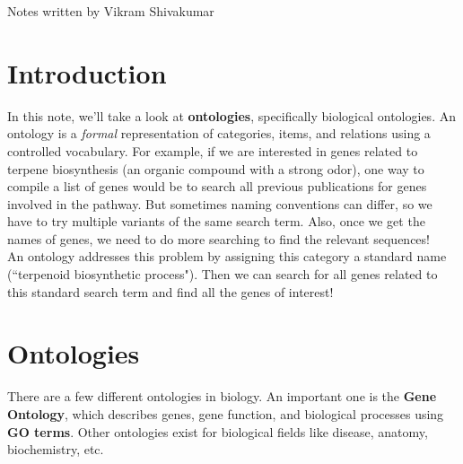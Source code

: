 \documentclass[12pt]{article}
\begin{document}
\thispagestyle{plain}
   \newpage
   \setcounter{page}{1}
   \noindent
   \begin{center}
   \end{center}
   {Notes written by Vikram Shivakumar}
   \vspace*{4mm}


\section{Introduction}
In this note, we'll take a look at \textbf{ontologies}, specifically biological ontologies. An ontology is a \textit{formal} representation of categories, items, and relations using a controlled vocabulary. For example, if we are interested in genes related to terpene biosynthesis (an organic compound with a strong odor), one way to compile a list of genes would be to search all previous publications for genes involved in the pathway. But sometimes naming conventions can differ, so we have to try multiple variants of the same search term. Also, once we get the names of genes, we need to do more searching to find the relevant sequences!\\[10pt]
An ontology addresses this problem by assigning this category a standard name (``terpenoid biosynthetic process"). Then we can search for all genes related to this standard search term and find all the genes of interest!

\section{Ontologies}
There are a few different ontologies in biology. An important one is the \textbf{Gene Ontology}, which describes genes, gene function, and biological processes using \textbf{GO terms}. Other ontologies exist for biological fields like disease, anatomy, biochemistry, etc.
\end{document}
